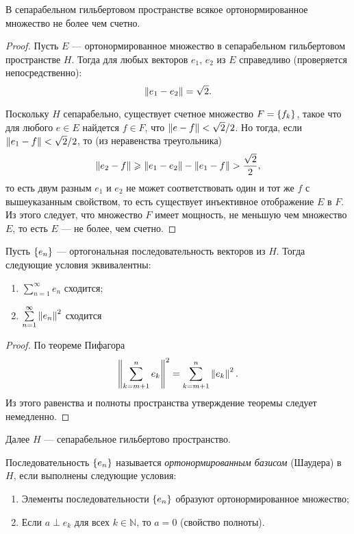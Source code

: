 \begin{lemma}     
В сепарабельном гильбертовом пространстве всякое ортонормированное множество не
более чем счетно.
\end{lemma}

\begin{proof}
    Пусть $E$ --- ортонормированное множество в сепарабельном гильбертовом пространстве $H$.
    Тогда для любых векторов $e_1$, $e_2$ из $E$ справедливо (проверяется непосредственно):
    \[ \left\|e_1 - e_2\right\| = \sqrt{2}. \]

    Поскольку $H$ сепарабельно, существует счетное множество $F = \left\{f_k\right\}$,
    такое что для любого $e \in E$ найдется $f \in F$, что $\left\|e - f\right\| < \sqrt{2}/2$.
    Но тогда, если $\left\|e_1 - f\right\| < \sqrt{2}/2$, то (из неравенства треугольника)
    \[ \left\|e_2 - f\right\| \geqslant \left\|e_1-e_2\right\| - \left\|e_1 - f\right\| > \frac{\sqrt{2}}{2}, \]
    то есть двум разным $e_1$ и $e_2$ не может соответствовать один и тот же $f$ с вышеуказанным свойством, то есть существует инъективное отображение $E$ в $F$.
    Из этого следует, что множество $F$ имеет мощность, не меньшую чем множество $E$, то есть $E$ --- не более, чем счетно.
\end{proof}

\begin{lemma}\label{le:series}
Пусть $\left\{e_n\right\}$ --- ортогональная последовательность векторов из $H$.
Тогда следующие условия эквивалентны:
\begin{enumerate}
    \item $\sum\limits_{n=1}^\infty e_n$ сходится;
    \item $\sum\limits_{n=1}^\infty \left\|e_n\right\|^2$ сходится
\end{enumerate}
\end{lemma}

\begin{proof}
    По теореме Пифагора
    \[ \left\|\sum_{k = m+1}^n e_k\right\|^2 = \sum_{k=m+1}^n \left\|e_k\right\|^2. \]
    Из этого равенства и полноты пространства утверждение теоремы следует немедленно.
\end{proof}

Далее $H$ --- сепарабельное гильбертово пространство.
\begin{definition}
    Последовательность $\left\{e_n\right\}$ называется \emph{ортонормированным базисом} (Шаудера) в $H$, если выполнены следующие условия:
    \begin{enumerate}
        \item Элементы последовательности $\left\{e_n\right\}$ образуют ортонормированное множество;
        \item Если $a \perp e_k$ для всех $k \in \mathbb N$, то $a = 0$ (свойство полноты).
    \end{enumerate}
\end{definition}

